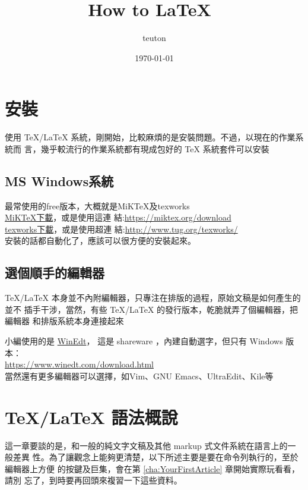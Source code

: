 \documentclass[12pt, a4paper]{report}
\title{How to \mbox{\LaTeX\ } }
\author{teuton}
\date{\today}
\begin{document}
\maketitle %
\begin{versionhistory}
\end{versionhistory}
\tableofcontents %
\listoftables %
\chapter{安裝}
  使用 TeX/LaTeX 系統，剛開始，比較麻煩的是安裝問題。不過，以現在的作業系統而
    言，幾乎較流行的作業系統都有現成包好的 TeX 系統套件可以安裝
  \section{MS Windows系統}
    最常使用的free版本，大概就是MiKTeX及texworks\\
    \href{https://miktex.org/download}{MiKTeX下載}，或是使用這連
      結:\url{https://miktex.org/download} \\
    \href{http://www.tug.org/texworks/}{texworks下載}，或是使用超連
      結:\url{http://www.tug.org/texworks/} \\
    安裝的話都自動化了，應該可以很方便的安裝起來。
  \section{選個順手的編輯器}
    TeX/LaTeX 本身並不內附編輯器，只專注在排版的過程，原始文稿是如何產生的並不
      插手干涉，當然，有些 TeX/LaTeX 的發行版本，乾脆就弄了個編輯器，把編輯器
      和排版系統本身連接起來
    
    小編使用的是 \href{https://www.winedt.com/download.html}{WinEdt}，
      這是 shareware ，內建自動選字，但只有 Windows 版本： \\
      \url{https://www.winedt.com/download.html} \\
    當然還有更多編輯器可以選擇，如Vim、GNU Emacs、UltraEdit、Kile等
\chapter{TeX/LaTeX 語法概說}
  這一章要談的是，和一般的純文字文稿及其他 markup 式文件系統在語言上的一般差異
    性。為了讓觀念上能夠更清楚，以下所述主要是要在命令列執行的，至於編輯器上方便
    的按鍵及巨集，會在第 \ref{cha:YourFirstArticle} 章開始實際玩看看，請別
    忘了，到時要再回頭來複習一下這些資料。
\end{document}
